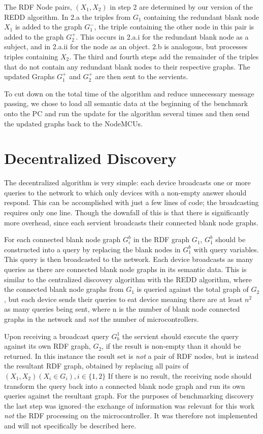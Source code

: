 The RDF Node pairs, $(X_1, X_2)$ in step 2 are determined by our version of the REDD algorithm. In 2.a the triples from $G_1$ containing the redundant blank node $X_1$ is added to the graph $G^-_1$, the triple containing the other node in this pair is added to the graph $G^+_2$. This occurs in 2.a.i for the redundant blank node as a subject, and in 2.a.ii for the node as an object. 2.b is analogous, but processes triples containing $X_2$. The third and fourth steps add the remainder of the triples that do not contain any redundant blank nodes to their respective graphs. The updated Graphs $G^{+}_{1}$ and $G^{+}_{2}$ are then sent to the servients.

To cut down on the total time of the algorithm and reduce unnecessary message passing, we chose to load all semantic data at the beginning of the benchmark onto the PC and run the update for the algorithm several times and then send the updated graphs back to the NodeMCUs.

\section{Decentralized Discovery}
The decentralized algorithm is very simple: each device broadcasts one or more queries to the network to which only devices with a non-empty answer should respond. This can be accomplished with just a few lines of code; the broadcasting requires only one line. Though the downfall of this is that there is significantly more overhead, since each servient broadcasts their connected blank node graphs.

For each connected blank node graph $G_i^{b}$ in the RDF graph $G_1$, $G_1^{b}$ should be constructed into a query by replacing the blank nodes in $G^{b}_{1}$ with query variables. This query is then broadcasted to the network. Each device broadcasts as many queries as there are connected blank node graphs in its semantic data. This is similar to the centralized discovery algorithm with the REDD algorithm, where the connected blank node graphs from $G_1$ is queried against the total graph of $G_2$, but each device sends their queries to eat device meaning there are at least $n^2$ as many queries being sent, where n is the number of blank node connected graphs in the network and \textit{not} the number of microcontrollers. 

Upon receiving a broadcast query $G_b^1$ the servient should execute the query against its own RDF graph, $G_{2}$, if the result is non-empty than it should be returned. In this instance the result set is \textit{not} a pair of RDF nodes, but is instead the resultant RDF graph, obtained by replacing all pairs of $(X_1, X_2) (X_i \in G_i), i \in \{1,2\}$ If there is no result, the receiving node should transform the query back into a connected blank node graph and run its own queries against the resultant graph. For the purposes of benchmarking discovery the last step was ignored--the exchange of information was relevant for this work \textit{not} the RDF processing on the microcontroller. It was therefore not implemented and will not specifically be described here.


